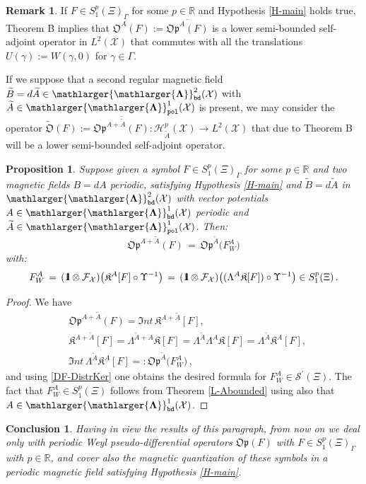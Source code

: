 \documentclass[12pt]{article}
\newtheorem{proposition}[theorem]{Proposition}
\theoremstyle{definition}
\newtheorem{remark}[theorem]{Remark}
\newtheorem{conclusion}[theorem]{Conclusion}
\def\R{\mathbb{R}}
\def\Op{\mathfrak{Op}}
\def\X{\mathcal X}
\def\bb1{{\rm{1}\hspace{-3pt}\mathbf{l}}}
\def\Int{\mathfrak{I}\mathit{nt}}
\def\tB{\widetilde{B}}
\def\tA{\widetilde{A}}
\def\tmO{\widetilde{\mO}}
\def\Fb{\mathlarger{\mathlarger{\mathbf{\Lambda}}}_{\text{\tt bd}}}
\def\Fp{\mathlarger{\mathlarger{\mathbf{\Lambda}}}_{\text{\tt pol}}}
\def\mO{\mathfrak{O}}
\numberwithin{equation}{section}
\begin{document}
\begin{remark}\label{R-OAF}
If $F\in{S}^p_1(\Xi)_\Gamma$ for some $p\in\R$ and  Hypothesis \ref{H-main} holds true,  Theorem B implies that $\mO^A(F):=\overline{\Op^A(F)}$ is a lower semi-bounded self-adjoint operator in $L^2(\X)$ that commutes with all the translations $U(\gamma):=W(\gamma,0)$ for $\gamma\in\Gamma$.
\end{remark}

If we suppose that a second regular magnetic field $\tB=d\tA\in\Fb^2(\X)$ with $\tA\in\Fp^1(\X)$ is present, we may consider the operator $\tmO(F):=\overline{\Op^{A+\tA}(F)}:\mathscr{H}^p_{\tA}(\X)\rightarrow{L}^2(\X)$ that due to Theorem B will be a lower semi-bounded self-adjoint operator.

\begin{proposition}\label{C-L}
	Suppose given a symbol $F\in{S}^p_1(\Xi)_{\Gamma}$ for some $p\in\R$ and two magnetic fields $B=dA$ periodic, satisfying Hypothesis \ref{H-main} and $\tB=d\tA$ in $\Fb^2(\X)$ with vector potentials $A\in\Fb^1(\X)$ periodic and $\tA\in\Fp^1(\X)$. Then:
	\[
	\Op^{A+\tA}(F)\,=\,\Op^{\tA}\big(F^{A}_W\big)
	\]
	with: $$F^{A}_W\,=\,
	(\bb1\otimes\mathcal{F}_{\X})\big(\mathfrak{K}^{A}[F]\circ\Upsilon^{-1}\big)\,=\,
	(\bb1\otimes\mathcal{F}_{\X})\big((\Lambda^{A}\mathfrak{K}[F])\circ\Upsilon^{-1}\big)\in{S}^p_1(\Xi)\,.$$
\end{proposition}
\begin{proof}
We have
	\begin{align*}
		&\Op^{A+\tA}(F)=\Int\,\mathfrak{K}^{A+\tA}[F],\\
		&\mathfrak{K}^{A+\tA}[F]=\Lambda^{\tA+A}\mathfrak{K}[F]=\Lambda^{\tA}\Lambda^{A}\mathfrak{K}[F]=\Lambda^{\tA}\mathfrak{K}^{A}[F],\\
		&\Int\,\Lambda^{\tA}\mathfrak{K}^{A}[F]=:\Op^{\tA}\big(F^{A}_W\big)\,,
	\end{align*}
	and using \eqref{DF-DistrKer} one obtains the desired formula for $F^{A}_W\in\mathscr{S}^\prime(\Xi)$. The fact that $F^{A}_W\in{S}^p_1(\Xi)$ follows from Theorem \ref{L-Abounded} using also that $A\in\Fb^1(\X)$.
\end{proof}

\begin{conclusion}
\textit{Having in view the results of this paragraph, from now on we deal only with periodic Weyl pseudo-differential operators $\Op(F)$ with $F\in{S}^p_1(\Xi)_{\Gamma}$ with $p\in\R$, and cover also the magnetic quantization of these symbols in a periodic magnetic field satisfying Hypothesis \eqref{H-main}.}
\end{conclusion}
\end{document}
